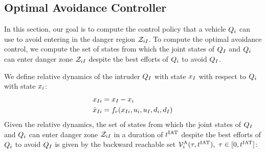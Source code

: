 \subsection{Optimal Avoidance Controller} \label{sec:intruder_avoid}
In this section, our goal is to compute the control policy that a vehicle $Q_i$ can use to avoid entering in the danger region $\mathcal{Z}_{iI}$. To compute the optimal avoidance control, we compute the set of states from which the joint states of $Q_{I}$ and $Q_i$ can enter danger zone $\mathcal{Z}_{iI}$ despite the best efforts of $Q_i$ to avoid $Q_{I}$. 

We define relative dynamics of the intruder $Q_{I}$ with state $x_I$ with respect to $Q_i$ with state $x_i$:
\begin{equation}
\label{eq:reldyn}
\begin{aligned}
\state_{\intr i} &= \state_\intr - \state_i \\
\dot \state_{\intr i} &= f_r(\state_{\intr i}, \ctrl_i, \ctrl_\intr, \dstb_i, \dstb_\intr)
\end{aligned}
\end{equation}
Given the relative dynamics, the set of states from which the joint states of $Q_{I}$ and $Q_{i}$ can enter danger zone $\mathcal{Z}_{iI}$ in a duration of $t^\text{IAT}$ despite the best efforts of $Q_i$ to avoid $Q_{I}$ is given by the backward reachable set $\mathcal{V}^{\text{A}}_i(\tau, t^\text{IAT}),~ \tau \in [0, t^\text{IAT}]$:

